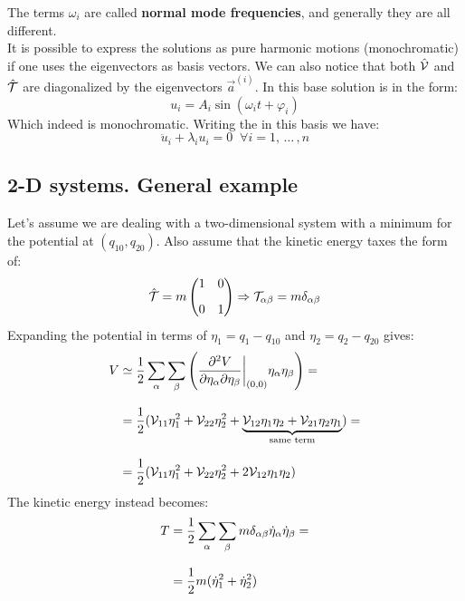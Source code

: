 The terms $\omega_i$ are called \textbf{normal mode frequencies}, and generally they are all different.\\
It is possible to express the solutions as pure harmonic motions (monochromatic) if one uses the eigenvectors as basis vectors. We can also notice that both $\hat{\mathcal{V}}$ and $\hat{\mathcal{T}}$ are diagonalized by the eigenvectors $\vec{a}^{(i)}$.
In this base solution is in the form:
\begin{equation}
    u_i = A_i \sin(\omega_i t + \varphi_i)
\end{equation}
Which indeed is monochromatic. Writing the \eleref\;in this basis we have:
\begin{equation}
    \ddot{u}_i +\lambda_i u_i = 0 \;\;\forall i=1, \,\dots\, ,n
\end{equation}
\subsection{2-D systems. General example}
Let's assume we are dealing with a two-dimensional system with a minimum for the potential at $(q_{10},q_{20})$. Also assume that the kinetic energy taxes the form of:
\begin{equation}
    \hat{\mathcal{T}} = m\begin{pmatrix}
        1 & 0\\[8pt]
        0 & 1
    \end{pmatrix} \Rightarrow \mathcal{T}_{\alpha \beta} = m\delta_{\alpha \beta}
\end{equation}
Expanding the potential in terms of $\eta_1 = q_1-q_{10}$ and $\eta_2 = q_2-q_{20}$ gives:
\begin{equation}
    \begin{split}
        V &\simeq \dfrac{1}{2}\displaystyle\sum_{\alpha}\displaystyle\sum_{\beta}\left(\dfrac{\partial^2 V}{\partial \eta_{\alpha} \partial \eta_{\beta}}\bigg|_{(0,0)}\eta_{\alpha}\eta_{\beta}\right) =\\[8pt]
        &= \dfrac{1}{2}(\mathcal{V}_{11}\eta_1^2 + \mathcal{V}_{22}\eta_2^2 + \underbrace{\mathcal{V}_{12}\eta_1\eta_2 + \mathcal{V}_{21}\eta_2\eta_1}_{\text{same term}}) =\\[8pt]
        &= \dfrac{1}{2}(\mathcal{V}_{11}\eta_1^2 + \mathcal{V}_{22}\eta_2^2 + 2\mathcal{V}_{12}\eta_1\eta_2 )
    \end{split}
\end{equation}
The kinetic energy instead becomes:
\begin{equation}
    \begin{split}
        T &= \dfrac{1}{2}\displaystyle\sum_{\alpha}\displaystyle\sum_{\beta}m \delta_{\alpha \beta} \dot{\eta}_{\alpha}\dot{\eta}_{\beta} =\\[8pt]
        &= \dfrac{1}{2}m(\dot{\eta}_1^2 + \dot{\eta}_2^2)
    \end{split}
\end{equation}
